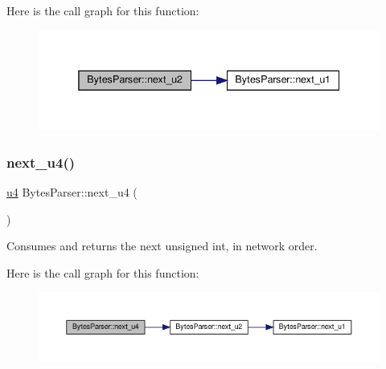 Here is the call graph for this function\+:\nopagebreak
\begin{figure}[H]
\begin{center}
\leavevmode
\includegraphics[width=338pt]{classBytesParser_a8c1d8a37eabff268351e38706a78ce2a_cgraph}
\end{center}
\end{figure}
\mbox{\label{classBytesParser_a1023beb9a406a24c4080c95fbe8fd884}} 
\subsubsection{\texorpdfstring{next\+\_\+u4()}{next\_u4()}}
{\footnotesize\ttfamily \hyperlink{types_8h_af3b2d4b29fd9faedc984db3e062b3d5d}{u4} Bytes\+Parser\+::next\+\_\+u4 (\begin{DoxyParamCaption}{ }\end{DoxyParamCaption})}



Consumes and returns the next unsigned int, in network order. 

Here is the call graph for this function\+:\nopagebreak
\begin{figure}[H]
\begin{center}
\leavevmode
\includegraphics[width=350pt]{classBytesParser_a1023beb9a406a24c4080c95fbe8fd884_cgraph}
\end{center}
\end{figure}
\mbox{\label{classBytesParser_ab7c84f75bd3dc2bcac74fd3ff4c6510a}} 
